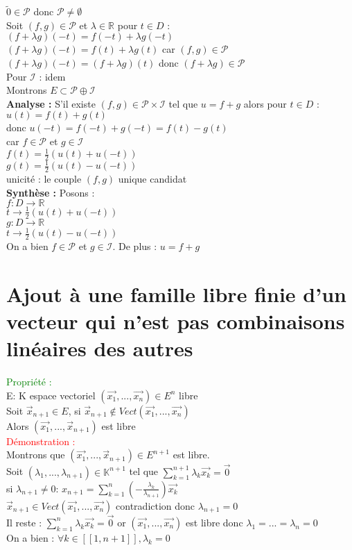 \documentclass{article}
\begin{document}
$\tilde{0} \in \mathcal{P}$ donc $\mathcal{P} \neq \emptyset$ \\ 
Soit $(f,g) \in \mathcal{P}$ et $\lambda \in \mathbb{R}$ pour $t \in D$ : \\ 
$(f+\lambda g)(-t)=f(-t)+\lambda g(-t)$ \\ 
$(f+\lambda g)(-t)=f(t)+\lambda g(t)$ car $(f,g) \in \mathcal{P}$ \\ 
$(f+\lambda g)(-t)=(f+\lambda g)(t)$ donc $(f+\lambda g)\in \mathcal{P}$ \\ 
Pour $\mathcal{I}$ : idem \\ 
Montrons $E \subset \mathcal{P} \oplus \mathcal{I}$ \\ 
{\bf Analyse :} S'il existe $(f,g) \in \mathcal{P} \times \mathcal{I}$ tel que $u=f+g$ alors pour $t \in D$ :\\
$u(t)=f(t)+g(t)$ \\ 
donc $u(-t)=f(-t)+g(-t)=f(t)-g(t)$ \\ 
car $f \in \mathcal{P}$ et $g \in \mathcal{I}$ \\ 
$f(t)=\frac{1}{2}(u(t)+u(-t))$ \\ 
$g(t)=\frac{1}{2}(u(t)-u(-t))$ \\ 
unicité : le couple $(f,g)$ unique candidat \\
{\bf Synthèse :} Posons : \\ 
$f: D \rightarrow \mathbb{R}$ \\ 
$t \rightarrow \frac{1}{2}(u(t)+u(-t))$ \\ 
$g: D \rightarrow \mathbb{R}$ \\ 
$t \rightarrow \frac{1}{2}(u(t)-u(-t))$ \\ 
On a bien $f \in \mathcal{P}$ et $g \in \mathcal{I}$.
De plus : $u= f+g$
\section{Ajout à une famille libre finie d'un vecteur qui n'est pas combinaisons linéaires des autres}
\textcolor{green}{Propriété :} \\ 
E: K espace vectoriel $(\vec{x_1},...,\vec{x_n}) \in E^n$ libre \\
Soit $\vec{x}_{n+1} \in E$, si $\vec{x}_{n+1} \notin Vect(\vec{x_1},...,\vec{x_n})$ \\ 
Alors $(\vec{x_1},...,\vec{x}_{n+1})$ est libre \\ 
\textcolor{red}{Démonstration :} \\ 
Montrons que $(\vec{x_1},...,\vec{x}_{n+1}) \in E^{n+1}$ est libre. \\ 
Soit $(\lambda_1,...,\lambda_{n+1})\in \mathbb{K}^{n+1}$ tel que $\sum_{k=1}^{n+1} \lambda_k\vec{x_k}=\vec{0}$ \\ 
si $\lambda_{n+1}\neq 0$: $x_{n+1}=\sum_{k=1}^n(-\frac{\lambda_k}{\lambda_{n+1}})\vec{x_k}$ \\ 
$\vec{x}_{n+1} \in Vect(\vec{x_1},...,\vec{x_n})$ contradiction donc $\lambda_{n+1}=0$ \\ 
Il reste : $\sum_{k=1}^n \lambda_k \vec{x_k}= \vec{0}$ or $(\vec{x_1},...,\vec{x_n})$ est libre donc $\lambda_1=...=\lambda_n=0$ \\ 
On a bien : $\forall k \in [[1,n+1]], \lambda_k=0$
\end{document}
